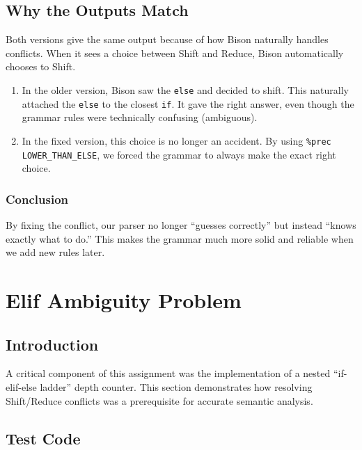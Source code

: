 \documentclass{article}
\begin{document}
\subsection{Why the Outputs Match}

Both versions give the same output because of how Bison naturally handles conflicts. When it sees a choice between Shift and Reduce, Bison automatically chooses to Shift.

\begin{enumerate}
    \item  In the older version, Bison saw the \texttt{else} and decided to shift. This naturally attached the \texttt{else} to the closest \texttt{if}. It gave the right answer, even though the grammar rules were technically confusing (ambiguous).
    
    \item  In the fixed version, this choice is no longer an accident. By using \texttt{\%prec LOWER\_THAN\_ELSE}, we forced the grammar to always make the exact right choice.
\end{enumerate}

\subsubsection{Conclusion}

By fixing the conflict, our parser no longer ``guesses correctly'' but instead ``knows exactly what to do.'' This makes the grammar much more solid and reliable when we add new rules later.



\section{Elif Ambiguity Problem}
\label{sec:elif_ambiguity_analysis}

\subsection{Introduction}

A critical component of this assignment was the implementation of a nested ``if-elif-else ladder'' depth counter. This section demonstrates how resolving Shift/Reduce conflicts was a prerequisite for accurate semantic analysis.

\subsection{Test Code}
\end{document}
